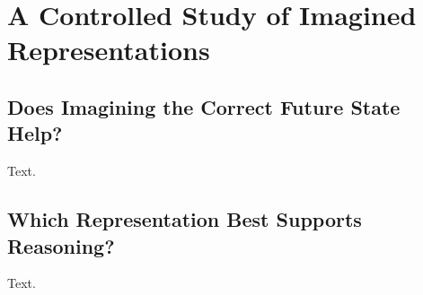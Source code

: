 \documentclass[twocolumn]{article}
\begin{document}
\section{A Controlled Study of Imagined Representations}
\subsection{Does Imagining the Correct Future State Help?}
Text.
\subsection{Which Representation Best Supports Reasoning?}
Text.

\end{document}
